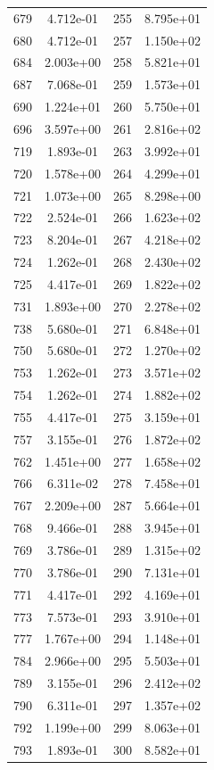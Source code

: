 \documentclass[12pt]{article}
\begin{document}
\begin{longtable}{@{}cccc@{}}
679 & 4.712e-01 & 255 & 8.795e+01 \\
680 & 4.712e-01 & 257 & 1.150e+02 \\
684 & 2.003e+00 & 258 & 5.821e+01 \\
687 & 7.068e-01 & 259 & 1.573e+01 \\
690 & 1.224e+01 & 260 & 5.750e+01 \\
696 & 3.597e+00 & 261 & 2.816e+02 \\
719 & 1.893e-01 & 263 & 3.992e+01 \\
720 & 1.578e+00 & 264 & 4.299e+01 \\
721 & 1.073e+00 & 265 & 8.298e+00 \\
722 & 2.524e-01 & 266 & 1.623e+02 \\
723 & 8.204e-01 & 267 & 4.218e+02 \\
724 & 1.262e-01 & 268 & 2.430e+02 \\
725 & 4.417e-01 & 269 & 1.822e+02 \\
731 & 1.893e+00 & 270 & 2.278e+02 \\
738 & 5.680e-01 & 271 & 6.848e+01 \\
750 & 5.680e-01 & 272 & 1.270e+02 \\
753 & 1.262e-01 & 273 & 3.571e+02 \\
754 & 1.262e-01 & 274 & 1.882e+02 \\
755 & 4.417e-01 & 275 & 3.159e+01 \\
757 & 3.155e-01 & 276 & 1.872e+02 \\
762 & 1.451e+00 & 277 & 1.658e+02 \\
766 & 6.311e-02 & 278 & 7.458e+01 \\
767 & 2.209e+00 & 287 & 5.664e+01 \\
768 & 9.466e-01 & 288 & 3.945e+01 \\
769 & 3.786e-01 & 289 & 1.315e+02 \\
770 & 3.786e-01 & 290 & 7.131e+01 \\
771 & 4.417e-01 & 292 & 4.169e+01 \\
773 & 7.573e-01 & 293 & 3.910e+01 \\
777 & 1.767e+00 & 294 & 1.148e+01 \\
784 & 2.966e+00 & 295 & 5.503e+01 \\
789 & 3.155e-01 & 296 & 2.412e+02 \\
790 & 6.311e-01 & 297 & 1.357e+02 \\
792 & 1.199e+00 & 299 & 8.063e+01 \\
793 & 1.893e-01 & 300 & 8.582e+01 \\

\end{longtable}
\end{document}

